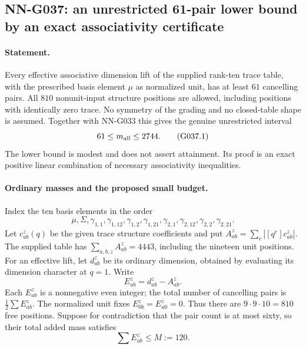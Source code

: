 \subsection{NN-G037: an unrestricted 61-pair lower bound by an exact associativity certificate}
\paragraph{Statement.}
Every effective associative dimension lift of the supplied
rank-ten trace table, with the prescribed basis element
$\mu$ as normalized unit, has at least $61$ cancelling pairs.
All $810$ nonunit-input structure positions are allowed,
including positions with identically zero trace.
No symmetry of the grading and no closed-table shape
is assumed. Together with NN-G033 this gives the genuine
unrestricted interval
\[
                              61\le m_{\rm all}\le2744.             \tag{G037.1}
\]
The lower bound is modest and does not assert attainment.
Its proof is an exact positive linear combination of
necessary associativity inequalities.

\paragraph{Ordinary masses and the proposed small budget.}
Index the ten basis elements in the order
\[
 \mu,\Sigma,\gamma_{1,1},\gamma_{1,12},\gamma_{1,2},
 \gamma_{1,21},\gamma_{2,1},\gamma_{2,12},
 \gamma_{2,2},\gamma_{2,21}.
\]
Let $c_{ab}^z(q)$ be the given trace structure coefficients
and put $A_{ab}^z=\sum_e|[q^e]c_{ab}^z|$.
The supplied table has
$\sum_{a,b,z}A_{ab}^z=4443$, including the nineteen
unit positions.
For an effective lift, let $d_{ab}^z$ be its ordinary
dimension, obtained by evaluating its dimension character
at $q=1$. Write
\[
 E_{ab}^z=d_{ab}^z-A_{ab}^z.
\]
Each $E_{ab}^z$ is a nonnegative even integer;
the total number of cancelling pairs is
$\frac12\sum E_{ab}^z$.
The normalized unit fixes $E_{0b}^z=E_{a0}^z=0$.
Thus there are $9\cdot9\cdot10=810$ free positions.
Suppose for contradiction that the pair count is at most
sixty, so their total added mass satisfies
\[
                         \sum E_{ab}^z\le M:=120.                  \tag{G037.2}
\]

